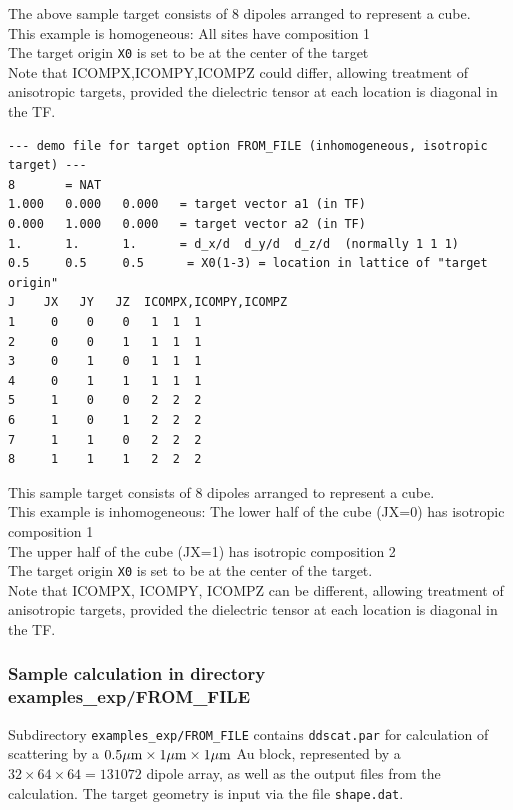 \noindent The above sample target consists of 8 dipoles arranged to represent a cube.\\
This example is homogeneous: All sites have composition 1\\
The target origin {\tt X0} is set to be at the center of the target\\
Note that ICOMPX,ICOMPY,ICOMPZ could differ, allowing treatment
of anisotropic targets, provided the dielectric tensor at each location
is diagonal in the TF.

{\footnotesize
\begin{verbatim}
--- demo file for target option FROM_FILE (inhomogeneous, isotropic target) ---
8       = NAT
1.000   0.000   0.000   = target vector a1 (in TF)
0.000   1.000   0.000   = target vector a2 (in TF)
1.      1.      1.      = d_x/d  d_y/d  d_z/d  (normally 1 1 1)
0.5     0.5     0.5      = X0(1-3) = location in lattice of "target origin"
J    JX   JY   JZ  ICOMPX,ICOMPY,ICOMPZ
1     0    0    0   1  1  1
2     0    0    1   1  1  1
3     0    1    0   1  1  1
4     0    1    1   1  1  1
5     1    0    0   2  2  2
6     1    0    1   2  2  2
7     1    1    0   2  2  2
8     1    1    1   2  2  2
\end{verbatim}}

\noindent This sample target consists of 8 dipoles 
arranged to represent a cube.\\
This example is inhomogeneous: The lower half of the cube (JX=0) has isotropic 
composition 1\\
The upper half of the cube (JX=1) has isotropic composition 2\\
The target origin {\tt X0} is set to be at the center of the target.\\
Note that ICOMPX, ICOMPY, ICOMPZ can be different, allowing treatment
of anisotropic targets, provided the dielectric tensor at each location
is diagonal in the TF.

\subsubsection{\bf Sample calculation in directory examples\_exp/FROM\_FILE}

Subdirectory {\tt examples\_exp/FROM\_FILE} contains {\tt ddscat.par} 
for calculation 
of scattering by a $0.5{\mu{\rm m}}\times1{\mu{\rm m}}\times1{\mu{\rm m}}$ Au block,
represented by a $32\times64\times64 = 131072$ dipole array, as well as
the output files from the calculation.
The target geometry is input via the file {\tt shape.dat}.

